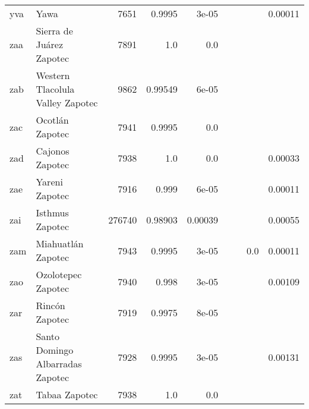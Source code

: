 \documentclass[11pt]{article}
\begin{document}
\begin{table*}[h]
{\begin{tabular}{llrrrrrrr}
yva         & Yawa         & 7651         & 0.9995         & 3e-05         &          &          &          & 0.00011         \\

zaa         & Sierra de Juárez Zapotec         & 7891         & 1.0         & 0.0         &          &          &          &          \\

zab         & Western Tlacolula Valley Zapotec         & 9862         & 0.99549         & 6e-05         &          &          &          &          \\

zac         & Ocotlán Zapotec         & 7941         & 0.9995         & 0.0         &          &          &          &          \\

zad         & Cajonos Zapotec         & 7938         & 1.0         & 0.0         &          &          &          & 0.00033         \\

zae         & Yareni Zapotec         & 7916         & 0.999         & 6e-05         &          &          &          & 0.00011         \\

zai         & Isthmus Zapotec         & 276740         & 0.98903         & 0.00039         &          &          &          & 0.00055         \\

zam         & Miahuatlán Zapotec         & 7943         & 0.9995         & 3e-05         &          &          & 0.0         & 0.00011         \\

zao         & Ozolotepec Zapotec         & 7940         & 0.998         & 3e-05         &          &          &          & 0.00109         \\

zar         & Rincón Zapotec         & 7919         & 0.9975         & 8e-05         &          &          &          &          \\

zas         & Santo Domingo Albarradas Zapotec         & 7928         & 0.9995         & 3e-05         &          &          &          & 0.00131         \\

zat         & Tabaa Zapotec         & 7938         & 1.0         & 0.0         &          &          &          &          \\


\end{tabular}}
\end{table*}
\end{document}
